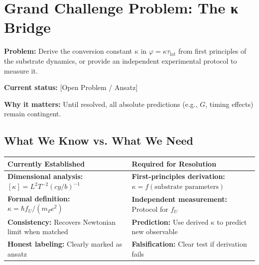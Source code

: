 
\section{Grand Challenge Problem: The κ Bridge}
\label{sec:kappa-grand-challenge}

\begin{tcolorbox}[colback=red!5!white,colframe=red!75!black,title=Grand Challenge Problem \#1: Deriving κ]
\label{gcp:kappa}
\textbf{Problem:} Derive the conversion constant $\kappa$ in $\varphi = \kappa \tau_{\mathrm{lat}}$ from first principles of the substrate dynamics, or provide an independent experimental protocol to measure it.

\textbf{Current status:} [Open Problem / Ansatz]

\textbf{Why it matters:} Until resolved, all absolute predictions (e.g., $G$, timing effects) remain contingent.
\end{tcolorbox}

\subsection{What We Know vs. What We Need}

\begin{tabular}{p{}p{}}
\textbf{Currently Established} & \textbf{Required for Resolution} \\ \hline
\textbf{Dimensional analysis:} $[\kappa] = L^2 T^{-2} (cy/b)^{-1}$ & \textbf{First-principles derivation:} $\kappa = f(\text{substrate parameters})$ \\
\textbf{Formal definition:} $\kappa = \hbar f_U / (m_P c^2)$ & \textbf{Independent measurement:} Protocol for $f_U$ \\
\textbf{Consistency:} Recovers Newtonian limit when matched & \textbf{Prediction:} Use derived $\kappa$ to predict new observable \\
\textbf{Honest labeling:} Clearly marked as ansatz & \textbf{Falsification:} Clear test if derivation fails \\
\end{tabular}

